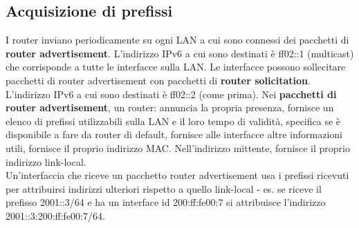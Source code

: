\documentclass{article}
\begin{document}
\subsection{Acquisizione di prefissi}
I router inviano periodicamente su ogni LAN a cui sono connessi dei pacchetti di \textbf{router advertisement}. L'indirizzo IPv6 a cui sono destinati è ff02::1 (multicast) che corrisponde a tutte le interfacce sulla LAN. Le interfacce possono sollecitare pacchetti di router advertisement con pacchetti di \textbf{router solicitation}. L'indirizzo IPv6 a cui sono destinati è ff02::2 (come prima). Nei \textbf{pacchetti di router advertisement}, un router: annuncia la propria presenza, fornisce un elenco di prefissi utilizzabili sulla LAN e il loro tempo di validità, specifica se è disponibile a fare da router di default, fornisce alle interfacce altre informazioni utili, fornisce il proprio indirizzo MAC. Nell'indirizzo mittente, fornisce il proprio indirizzo link-local. \\
Un'interfaccia che riceve un pacchetto router advertisement usa i prefissi  ricevuti per attribuirsi indirizzi ulteriori rispetto a quello link-local - es. se riceve il prefisso 2001::3/64 e ha un interface id 200:ff:fe00:7 si attribuisce l'indirizzo 2001::3:200:ff:fe00:7/64. 
\end{document}
